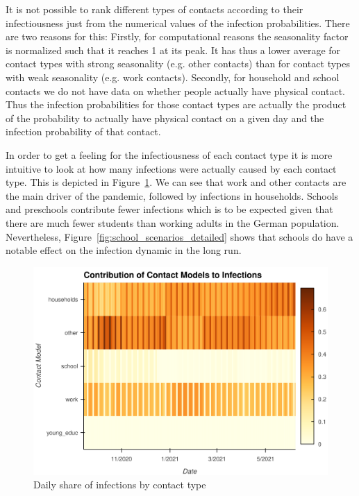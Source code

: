 It is not possible to rank different types of contacts according to their
infectiousness just from the numerical values of the infection probabilities.
There are two reasons for this: Firstly, for computational reasons the
seasonality factor is normalized such that it reaches 1 at its peak. It has thus
a lower average for contact types with strong seasonality (e.g. other contacts) than for
contact types with weak seasonality (e.g. work contacts). Secondly, for household and
school contacts we do not have data on whether people actually have physical contact.
Thus the infection probabilities for those contact types are actually the product of the
probability to actually have physical contact on a given day and the infection
probability of that contact.

In order to get a feeling for the infectiousness of each contact type it
is more intuitive to look at how many infections were actually caused by each contact
type. This is depicted in Figure~\ref{fig:infection_heatmap}. We can see that work and
other contacts are the main driver of the pandemic, followed by infections in
households. Schools and preschools contribute fewer infections which is to be expected
given that there are much fewer students than working adults in the German population.
Nevertheless, Figure~\ref{fig:school_scenarios_detailed} shows that schools do have a
notable effect on the infection dynamic in the long run.

\begin{figure}
    \centering
    \includegraphics[width=\textwidth]{figures/infection_channels.png}
    \caption{Daily share of infections by contact type}
    \label{fig:infection_heatmap}
\end{figure}

